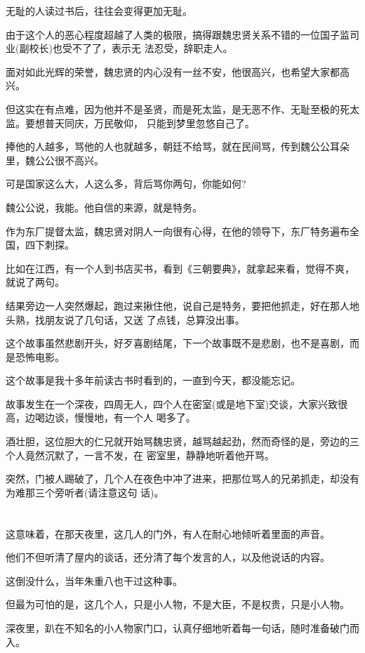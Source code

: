 \documentclass[11pt,a4paper,onecolumn]{article}
\begin{document}
无耻的人读过书后，往往会变得更加无耻。

由于这个人的恶心程度超越了人类的极限，搞得跟魏忠贤关系不错的一位国子监司业(副校长)也受不了了，表示无
法忍受，辞职走人。

面对如此光辉的荣誉，魏忠贤的内心没有一丝不安，他很高兴，也希望大家都高兴。

但这实在有点难，因为他并不是圣贤，而是死太监，是无恶不作、无耻至极的死太监。要想普天同庆，万民敬仰，
只能到梦里忽悠自己了。

捧他的人越多，骂他的人也就越多，朝廷不给骂，就在民间骂，传到魏公公耳朵里，魏公公很不高兴。

可是国家这么大，人这么多，背后骂你两句，你能如何?

魏公公说，我能。他自信的来源，就是特务。

作为东厂提督太监，魏忠贤对阴人一向很有心得，在他的领导下，东厂特务遍布全国，四下刺探。

比如在江西，有一个人到书店买书，看到《三朝要典》，就拿起来看，觉得不爽，就说了两句。

结果旁边一人突然爆起，跑过来揪住他，说自己是特务，要把他抓走，好在那人地头熟，找朋友说了几句话，又送
了点钱，总算没出事。

这个故事虽然悲剧开头，好歹喜剧结尾，下一个故事既不是悲剧，也不是喜剧，而是恐怖电影。

这个故事是我十多年前读古书时看到的，一直到今天，都没能忘记。

故事发生在一个深夜，四周无人，四个人在密室(或是地下室)交谈，大家兴致很高，边喝边谈，慢慢地，有一个人
喝多了。

酒壮胆，这位胆大的仁兄就开始骂魏忠贤，越骂越起劲，然而奇怪的是，旁边的三个人竟然沉默了，一言不发，在
密室里，静静地听着他开骂。

突然，门被人踢破了，几个人在夜色中冲了进来，把那位骂人的兄弟抓走，却没有为难那三个旁听者(请注意这句
话)。

\section[\thesection]{}

这意味着，在那天夜里，这几人的门外，有人在耐心地倾听着里面的声音。

他们不但听清了屋内的谈话，还分清了每个发言的人，以及他说话的内容。

这倒没什么，当年朱重八也干过这种事。

但最为可怕的是，这几个人，只是小人物，不是大臣，不是权贵，只是小人物。

深夜里，趴在不知名的小人物家门口，认真仔细地听着每一句话，随时准备破门而入。
\end{document}
